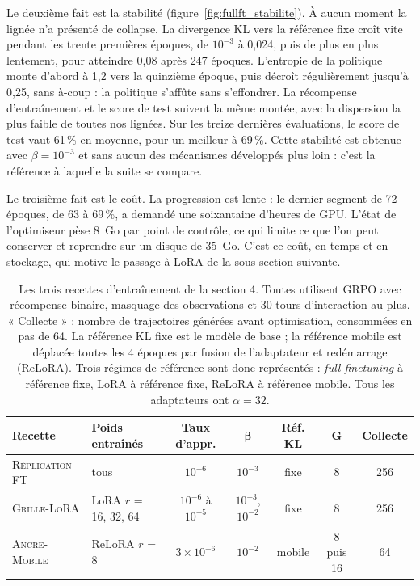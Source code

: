 \documentclass[11pt,a4paper]{article}
\begin{document}
Le deuxième fait est la stabilité (figure~\ref{fig:fullft_stabilite}). À aucun moment la lignée n'a présenté de collapse. La divergence KL vers la référence fixe croît vite pendant les trente premières époques, de $10^{-3}$ à 0{,}024, puis de plus en plus lentement, pour atteindre 0{,}08 après 247 époques. L'entropie de la politique monte d'abord à 1{,}2 vers la quinzième époque, puis décroît régulièrement jusqu'à 0{,}25, sans à-coup : la politique s'affûte sans s'effondrer. La récompense d'entraînement et le score de test suivent la même montée, avec la dispersion la plus faible de toutes nos lignées. Sur les treize dernières évaluations, le score de test vaut 61\,\% en moyenne, pour un meilleur à 69\,\%. Cette stabilité est obtenue avec $\beta = 10^{-3}$ et sans aucun des mécanismes développés plus loin : c'est la référence à laquelle la suite se compare.



Le troisième fait est le coût. La progression est lente : le dernier segment de 72 époques, de 63 à 69\,\%, a demandé une soixantaine d'heures de GPU. L'état de l'optimiseur pèse 8~Go par point de contrôle, ce qui limite ce que l'on peut conserver et reprendre sur un disque de 35~Go. C'est ce coût, en temps et en stockage, qui motive le passage à LoRA de la sous-section suivante.

\begin{table}[htbp]
\centering
\caption{Les trois recettes d'entraînement de la section 4. Toutes utilisent GRPO avec récompense binaire, masquage des observations et 30 tours d'interaction au plus. « Collecte » : nombre de trajectoires générées avant optimisation, consommées en pas de 64. La référence KL fixe est le modèle de base ; la référence mobile est déplacée toutes les 4 époques par fusion de l'adaptateur et redémarrage (ReLoRA). Trois régimes de référence sont donc représentés : \emph{full finetuning} à référence fixe, LoRA à référence fixe, ReLoRA à référence mobile. Tous les adaptateurs ont $\alpha = 32$.}
\label{tab:hyperparams}
\footnotesize
\setlength{\tabcolsep}{4pt}
\begin{tabular}{l l c c c c c}
\toprule
\textbf{Recette} & \textbf{Poids entraînés} & \textbf{Taux d'appr.} & $\boldsymbol{\beta}$ & \textbf{Réf. KL} & $\boldsymbol{G}$ & \textbf{Collecte} \\
\midrule
\textsc{Réplication-FT} & tous & $10^{-6}$ & $10^{-3}$ & fixe & 8 & 256 \\
\textsc{Grille-LoRA} & LoRA $r$ = 16, 32, 64 & $10^{-6}$ à $10^{-5}$ & $10^{-3}$, $10^{-2}$ & fixe & 8 & 256 \\
\textsc{Ancre-Mobile} & ReLoRA $r$ = 8 & $3 \times 10^{-6}$ & $10^{-2}$ & mobile & 8 puis 16 & 64 \\
\bottomrule
\end{tabular}
\end{table}
\end{document}
